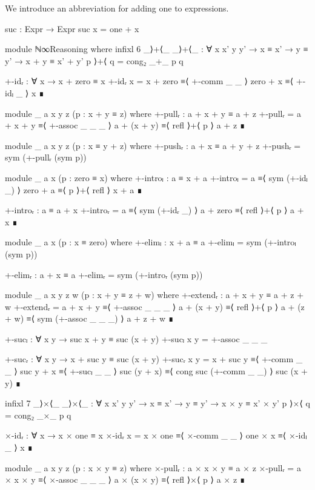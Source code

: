 We introduce an abbreviation for adding one to expressions.
\begin{code}
  suc : Expr → Expr
  suc x = one + x
\end{code}
\begin{code}[hide]
  module ℕ∞Reasoning where
    infixl 6 _⟩+⟨_
    _⟩+⟨_ : ∀ {x x' y y'} → x ≡ x' → y ≡ y' → x + y ≡ x' + y'
    p ⟩+⟨ q = cong₂ _+_ p q

    +-idᵣ : ∀ x → x + zero ≡ x
    +-idᵣ x =
      x + zero ≡⟨ +-comm _ _ ⟩
      zero + x ≡⟨ +-idₗ _ ⟩
      x        ∎

    module _ {a x y z} (p : x + y ≡ z) where
      +-pullᵣ : a + x + y ≡ a + z
      +-pullᵣ =
        a + x + y   ≡⟨ +-assoc _ _ _ ⟩
        a + (x + y) ≡⟨ refl ⟩+⟨ p ⟩
        a + z       ∎

    module _ {a x y z} (p : x ≡ y + z) where
      +-pushᵣ : a + x ≡ a + y + z
      +-pushᵣ = sym (+-pullᵣ (sym p))

    module _ {a x} (p : zero ≡ x) where
      +-introₗ : a ≡ x + a
      +-introₗ =
        a        ≡⟨ sym (+-idₗ _) ⟩
        zero + a ≡⟨ p ⟩+⟨ refl ⟩
        x + a    ∎

      +-introᵣ : a ≡ a + x
      +-introᵣ =
        a        ≡⟨ sym (+-idᵣ _) ⟩
        a + zero ≡⟨ refl ⟩+⟨ p ⟩
        a + x    ∎

    module _ {a x} (p : x ≡ zero) where
      +-elimₗ : x + a ≡ a
      +-elimₗ = sym (+-introₗ (sym p))

      +-elimᵣ : a + x ≡ a
      +-elimᵣ = sym (+-introᵣ (sym p))

    module _ {a x y z w} (p : x + y ≡ z + w) where
      +-extendᵣ : a + x + y ≡ a + z + w
      +-extendᵣ =
        a + x + y   ≡⟨ +-assoc _ _ _ ⟩
        a + (x + y) ≡⟨ refl ⟩+⟨ p ⟩
        a + (z + w) ≡⟨ sym (+-assoc _ _ _) ⟩
        a + z + w   ∎

    +-sucₗ : ∀ x y → suc x + y ≡ suc (x + y)
    +-sucₗ x y = +-assoc _ _ _

    +-sucᵣ : ∀ x y → x + suc y ≡ suc (x + y)
    +-sucᵣ x y =
      x + suc y   ≡⟨ +-comm _ _ ⟩
      suc y + x   ≡⟨ +-sucₗ _ _ ⟩
      suc (y + x) ≡⟨ cong suc (+-comm _ _) ⟩
      suc (x + y) ∎

    infixl 7 _⟩×⟨_
    _⟩×⟨_ : ∀ {x x' y y'} → x ≡ x' → y ≡ y' → x × y ≡ x' × y'
    p ⟩×⟨ q = cong₂ _×_ p q

    ×-idᵣ : ∀ x → x × one ≡ x
    ×-idᵣ x =
      x × one ≡⟨ ×-comm _ _ ⟩
      one × x ≡⟨ ×-idₗ _ ⟩
      x       ∎

    module _ {a x y z} (p : x × y ≡ z) where
      ×-pullᵣ : a × x × y ≡ a × z
      ×-pullᵣ =
        a × x × y   ≡⟨ ×-assoc _ _ _ ⟩
        a × (x × y) ≡⟨ refl ⟩×⟨ p ⟩
        a × z       ∎


\end{code}
